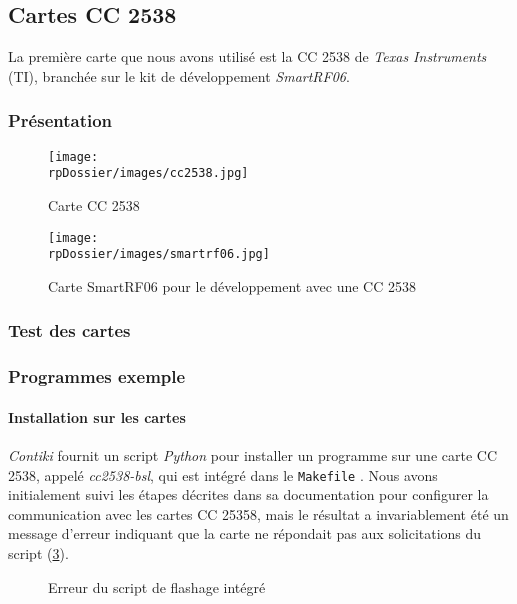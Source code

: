 \subsection{Cartes CC 2538}

La première carte que nous avons utilisé est la CC 2538 de \emph{Texas Instruments} (TI), branchée sur le kit de développement \emph{SmartRF06}.

\subsubsection{Présentation}

\begin{figure}[H]
\centering
\texttt{[image: \\rpDossier/images/cc2538.jpg]}
\caption{Carte CC 2538}
\label{cc2538}
\end{figure}

\begin{figure}[H]
\centering
\texttt{[image: \\rpDossier/images/smartrf06.jpg]}
\caption{Carte SmartRF06 pour le développement avec une CC 2538}
\label{smartrf06}
\end{figure}

\subsubsection{Test des cartes}


\subsubsection{Programmes exemple}

\paragraph{Installation sur les cartes}

\emph{Contiki} fournit un script \emph{Python} pour installer un programme sur une carte CC 2538, appelé \emph{cc2538-bsl}, qui est intégré dans le \texttt{Makefile} .
Nous avons initialement suivi les étapes décrites dans sa documentation pour configurer la communication avec les cartes CC 25358, mais le résultat a invariablement été un message d’erreur indiquant que la carte ne répondait pas aux solicitations du script (\cref{bsl-error}).

\begin{figure}[H]
\centering
{}
\caption{Erreur du script de flashage intégré}
\label{bsl-error}
\end{figure}

